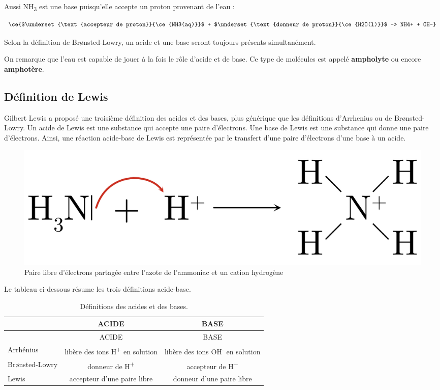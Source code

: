 \documentclass[
  11pt,
  french,
  a4paper,
  openany]{book}
\begin{document}
Aussi NH\textsubscript{3} est une base puisqu'elle accepte un proton provenant de l'eau :

\[
\ce{$\underset{\text{accepteur de proton}}{\ce{NH3(aq)}}$ + $\underset{\text{donneur de proton}}{\ce{H2O(l)}}$ -> NH4+ + OH-}
\]

Selon la définition de Brønsted-Lowry, un acide et une base seront toujours présents simultanément.

On remarque que l'eau est capable de jouer à la fois le rôle d'acide et de base. Ce type de molécules est appelé \textbf{ampholyte} ou encore \textbf{amphotère}.

\hypertarget{duxe9finition-de-lewis}{%
\subsection{Définition de Lewis}\label{duxe9finition-de-lewis}}

Gilbert Lewis a proposé une troisième définition des acides et des bases, plus générique que les définitions d'Arrhenius ou de Brønsted-Lowry. Un acide de Lewis est une substance qui accepte une paire d'électrons. Une base de Lewis est une substance qui donne une paire d'électrons. Ainsi, une réaction acide-base de Lewis est représentée par le transfert d'une paire d'électrons d'une base à un acide.

\begin{figure}

{\centering \includegraphics[width=0.33\linewidth]{images/acides-bases-2} 

}

\caption{Paire libre d'électrons partagée entre l'azote de l'ammoniac et un cation hydrogène}\label{fig:acides-bases-2}
\end{figure}
\clearpage

Le tableau ci-dessous résume les trois définitions acide-base.

\begin{longtable}[]{@{}lcc@{}}
\caption{\label{tab:acides-bases-definitions} Définitions des acides et des bases.}\tabularnewline
\toprule
& ACIDE & BASE\tabularnewline
\midrule
\endfirsthead
\toprule
& ACIDE & BASE\tabularnewline
\midrule
\endhead
Arrhénius & libère des ions H\textsuperscript{+} en solution & libère des ions OH\textsuperscript{-} en solution\tabularnewline
Brønsted-Lowry & donneur de H\textsuperscript{+} & accepteur de H\textsuperscript{+}\tabularnewline
Lewis & accepteur d'une paire libre & donneur d'une paire libre\tabularnewline
\bottomrule
\end{longtable}
\end{document}
